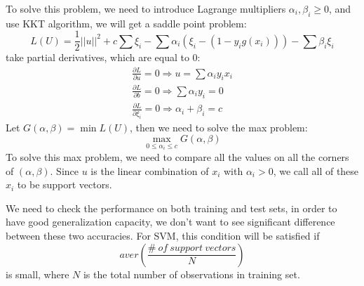 \documentclass{article}
\begin{document}
To solve this problem, we need to introduce Lagrange multipliers $\alpha_{i},\beta_{i} \geq 0$, and use KKT algorithm, we will get a saddle point
problem:
\begin{equation*}
  L(U) = \frac{1}{2}||u||^{2} + c\sum \xi_{i} - \sum \alpha_{i}(\xi_{i}-(1-y_{i}g(x_{i}))) - \sum \beta_{i}\xi_{i}
\end{equation*}
take partial derivatives, which are equal to 0:
\begin{equation*}
 \begin{aligned}
  \frac{\partial L}{\partial u} = 0 \Longrightarrow u = \sum \alpha_{i}y_{i}x_{i} \\
  \frac{\partial L}{\partial b} = 0 \Longrightarrow \sum \alpha_{i}y_{i} = 0 \\
  \frac{\partial L}{\partial \xi_{i}} = 0 \Longrightarrow \alpha_{i} + \beta_{i} = c
 \end{aligned}
\end{equation*}
Let $G(\alpha, \beta) = \min L(U)$, then we need to solve the max problem:
\begin{equation*}
 \max_{0 \leq \alpha_{i} \leq c} G(\alpha,\beta)
\end{equation*}
To solve this max problem, we need to compare all the values on all the corners of $(\alpha,\beta)$. Since $u$ is the linear combination of $x_{i}$
with $\alpha_{i}>0$, we call all of these $x_{i}$ to be support vectors.

We need to check the performance on both training and test sets, in order to have good generalization capacity, we don't want to see significant
difference between these two accuracies. For SVM, this condition will be satisfied if
\begin{equation*}
 aver(\frac{\# \ of \ support \ vectors}{N})
\end{equation*}
is small, where $N$ is the total number of observations in training set.
\end{document}
